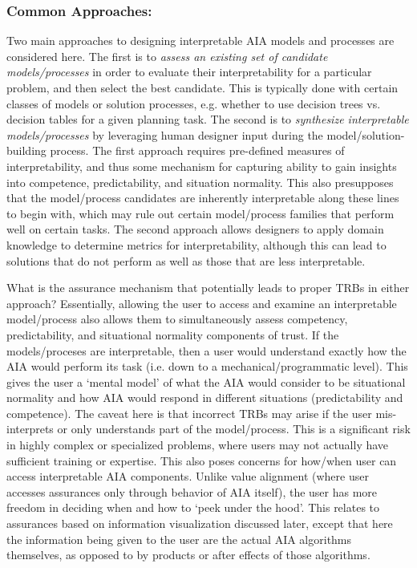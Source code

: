 \subsubsection{Common Approaches:}
Two main approaches to designing interpretable AIA models and processes are considered here. 
The first is to \emph{assess an existing set of candidate models/processes} in order to evaluate their interpretability for a particular problem, and then select the best candidate. 
This is typically done with certain classes of models or solution processes, e.g. whether to use decision trees vs. decision tables for a given planning task. 
The second is to \emph{synthesize interpretable models/processes} by leveraging human designer input during the model/solution-building process. 
The first approach requires pre-defined measures of interpretability, and thus some mechanism for capturing ability to gain insights into competence, predictability, and situation normality. This also presupposes that the model/process candidates are inherently interpretable along these lines to begin with, which may rule out certain model/process families that perform well on certain tasks. 
The second approach allows designers to apply domain knowledge to determine metrics for interpretability, although this can lead to solutions that do not perform as well as those that are less interpretable. 

What is the assurance mechanism that potentially leads to proper TRBs in either approach? 
Essentially, allowing the user to access and examine an interpretable model/process also allows them to simultaneously assess competency, predictability, and situational normality components of trust. If the models/proceses are interpretable, then a user would understand exactly how the AIA would perform its task (i.e. down to a mechanical/programmatic level). 
This gives the user a `mental model' of what the AIA would consider to be situational normality and how AIA would respond in different situations (predictability and competence). 
The caveat here is that incorrect TRBs may arise if the user mis-interprets or only understands part of the model/process. 
This is a significant risk in highly complex or specialized problems, where users may not actually have sufficient training or expertise. This also poses concerns for how/when user can access interpretable AIA components. 
Unlike value alignment (where user accesses assurances only through behavior of AIA itself), the user has more freedom in deciding when and how to `peek under the hood'. This relates to assurances based on information visualization discussed later, except that here the information being given to the user are the actual AIA algorithms themselves, as opposed to by products or after effects of those algorithms. 

